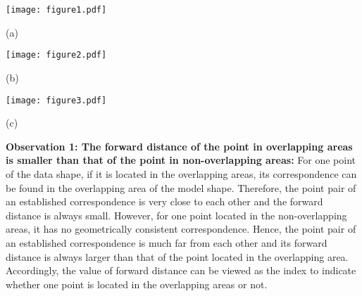 \documentclass[review]{elsarticle}
\begin{document}
\begin{figure*}[htbp]
\begin{minipage}[b]{.3\linewidth}
  \centering
  \centerline{\texttt{[image: figure1.pdf]}}
  \centerline{(a)}
\end{minipage}
\hfill
\begin{minipage}[b]{0.3\linewidth}
  \centering
  \centerline{\texttt{[image: figure2.pdf]}}
  \centerline{(b)}
\end{minipage}
\hfill
\begin{minipage}[b]{0.3\linewidth}
  \centering
  \centerline{\texttt{[image: figure3.pdf]}}
  \centerline{(c)}
\end{minipage}
\caption{ The framework of the proposed approach for registration of partially overlapping point clouds, where the solid curve indicates the overlapping areas, real and dashed line arrows denote the forward and backward distances, respectively. (a) Nearest neighbours with forward distances for each point in $D$. (b) According to the forward distance of each point, outliers can be discarded. (c) Correspondences with backward distances for some points in $M$, which are the nearest neighbours of points located in the overlapping areas of $D$.}\medskip
\label{fig:obse}
\end{figure*}

{\bfseries Observation 1: The forward distance of the point in overlapping areas is smaller than that of the point in non-overlapping areas:}
For one point of the data shape, if it is located in the overlapping areas, its correspondence can be found in the overlapping area of the model shape.
Therefore, the point pair of an established correspondence is very close to each other and the forward distance is always small. However, for one point located in the non-overlapping areas, it has no geometrically consistent correspondence. Hence, the point pair of an established correspondence is much far from each other and its forward distance is always larger than that of the point located in the overlapping area.
Accordingly, the value of forward distance can be viewed as the index to indicate whether one point is located in the overlapping areas or not.
\end{document}
